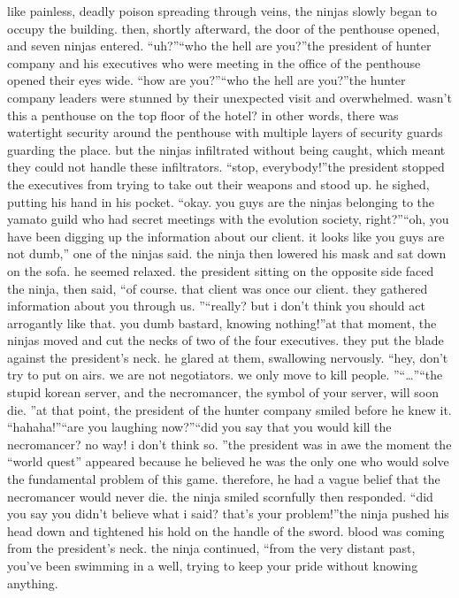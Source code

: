 like painless, deadly poison spreading through veins, the ninjas slowly began to occupy the building.
then, shortly afterward, the door of the penthouse opened, and seven ninjas entered.
“uh?”“who the hell are you?”the president of hunter company and his executives who were meeting in the office of the penthouse opened their eyes wide.
“how are you?”“who the hell are you?”the hunter company leaders were stunned by their unexpected visit and overwhelmed.
wasn’t this a penthouse on the top floor of the hotel? in other words, there was watertight security around the penthouse with multiple layers of security guards guarding the place.
but the ninjas infiltrated without being caught, which meant they could not handle these infiltrators.
“stop, everybody!”the president stopped the executives from trying to take out their weapons and stood up.
he sighed, putting his hand in his pocket.
“okay.
 you guys are the ninjas belonging to the yamato guild who had secret meetings with the evolution society, right?”“oh, you have been digging up the information about our client.
 it looks like you guys are not dumb,” one of the ninjas said.
the ninja then lowered his mask and sat down on the sofa.
 he seemed relaxed.
the president sitting on the opposite side faced the ninja, then said, “of course.
 that client was once our client.
 they gathered information about you through us.
”“really? but i don’t think you should act arrogantly like that.
 you dumb bastard, knowing nothing!”at that moment, the ninjas moved and cut the necks of two of the four executives.
they put the blade against the president’s neck.
 he glared at them, swallowing nervously.
“hey, don’t try to put on airs.
 we are not negotiators.
 we only move to kill people.
”“…”“the stupid korean server, and the necromancer, the symbol of your server, will soon die.
”at that point, the president of the hunter company smiled before he knew it.
“hahaha!”“are you laughing now?”“did you say that you would kill the necromancer? no way! i don’t think so.
”the president was in awe the moment the “world quest” appeared because he believed he was the only one who would solve the fundamental problem of this game.
 therefore, he had a vague belief that the necromancer would never die.
the ninja smiled scornfully then responded.
“did you say you didn’t believe what i said? that’s your problem!”the ninja pushed his head down and tightened his hold on the handle of the sword.
 blood was coming from the president’s neck.
the ninja continued, “from the very distant past, you’ve been swimming in a well, trying to keep your pride without knowing anything.
